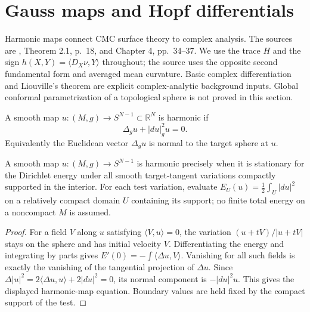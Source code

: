 \chapter{Gauss maps and Hopf differentials}\label{sec:gauss-map-hopf}
Harmonic maps connect CMC surface theory to complex analysis. The sources are \cite{Hel01}, Theorem 2.1, p.~18, and Chapter 4, pp.~34--37. We use the trace $H$ and the sign $h(X,Y)=\langle D_X\nu,Y\rangle$ throughout; the source uses the opposite second fundamental form and averaged mean curvature. Basic complex differentiation and Liouville's theorem are explicit complex-analytic background inputs. Global conformal parametrization of a topological sphere is not proved in this section.

\begin{definition}\label{def:sphere-valued-harmonic-map}
A smooth map $u:(M,g)\to S^{N-1}\subset\mathbb R^N$ is harmonic if
\[
 \Delta_gu+|du|_g^2u=0.
\]
Equivalently the Euclidean vector $\Delta_gu$ is normal to the target sphere at $u$.
\end{definition}

\begin{proposition}\label{prop:sphere-energy-equation}
A smooth map $u:(M,g)\to S^{N-1}$ is harmonic precisely when it is stationary for the Dirichlet energy under all smooth target-tangent variations compactly supported in the interior. For each test variation, evaluate $E_U(u)=\frac12\int_U|du|^2$ on a relatively compact domain $U$ containing its support; no finite total energy on a noncompact $M$ is assumed.
\end{proposition}
\begin{proof}
For a field $V$ along $u$ satisfying $\langle V,u\rangle=0$, the variation $(u+tV)/|u+tV|$ stays on the sphere and has initial velocity $V$. Differentiating the energy and integrating by parts gives $E'(0)=-\int\langle\Delta u,V\rangle$. Vanishing for all such fields is exactly the vanishing of the tangential projection of $\Delta u$. Since $\Delta|u|^2=2\langle\Delta u,u\rangle+2|du|^2=0$, its normal component is $-|du|^2u$. This gives the displayed harmonic-map equation. Boundary values are held fixed by the compact support of the test.
\end{proof}

